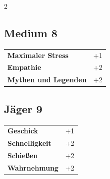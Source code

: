 \begin{multicols}{2}
\begin{tcolorbox}

\end{tcolorbox}

\begin{tcolorbox}
    \subsection*{Medium \hfill \small{8 }}
    \tcblower




\begin{tabular}{@{}ll@{}}
    \textbf{Maximaler Stress} & +1\\
    \textbf{Empathie} & +2\\
    \textbf{Mythen und Legenden} & +2\\
\end{tabular}


\end{tcolorbox}

\begin{tcolorbox}
    \subsection*{Jäger \hfill \small{9 }}
    \tcblower




\begin{tabular}{@{}ll@{}}
    \textbf{Geschick} & +1\\
    \textbf{Schnelligkeit} & +2\\
    \textbf{Schießen} & +2\\
    \textbf{Wahrnehmung} & +2\\
\end{tabular}


\end{tcolorbox}


\end{multicols}
